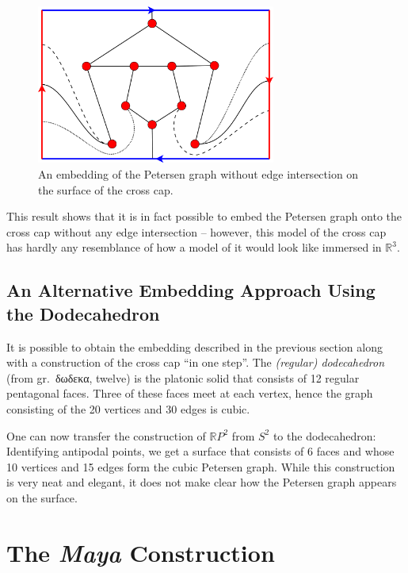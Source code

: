\documentclass[11pt,            %
               a4paper,         %
               oneside,         %
               DIV12,           %
               fleqn,           %
               halfparskip,     %
               nochapterprefix, %
              ]{scrartcl} %
\theoremstyle{definition}
\begin{document}
\begin{figure}[h]
  \centering
  \includegraphics[keepaspectratio=true,width=0.7\textwidth]{../planar-graphs/crosscap-embedding-print.pdf}
  \caption{An embedding of the Petersen graph without edge
    intersection on the surface of the cross cap.}
  \label{fig:rp2embedding}
\end{figure}

This result shows that it is in fact possible to embed the Petersen
graph onto the cross cap without any edge intersection -- however,
this model of the cross cap has hardly any resemblance of how a model
of it would look like immersed in $\mathbb{R}^3$.


\subsection{An Alternative Embedding Approach Using the Dodecahedron}
\label{sec:dodecahedron}

It is possible to obtain the embedding described in the previous
section along with a construction of the cross cap “in one step”. The
\emph{(regular) dodecahedron} (from gr.~\textgreek{δωδεκα}, twelve) is
the platonic solid that consists of 12 regular pentagonal faces. Three
of these faces meet at each vertex, hence the graph consisting of the
20 vertices and 30 edges is cubic.

One can now transfer the construction of $\mathbb{R}P^2$ from $S^2$ to
the dodecahedron: Identifying antipodal points, we get a surface that
consists of 6 faces and whose 10 vertices and 15 edges form the cubic
Petersen graph. While this construction is very neat and elegant, it
does not make clear how the Petersen graph appears on the surface.

\section{The \emph{Maya} Construction}
\label{sec:maya}
\end{document}
